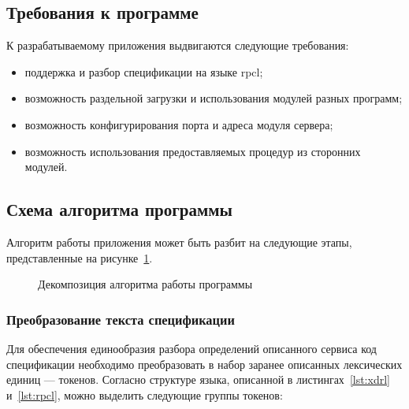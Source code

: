 
\vspace{-1\baselineskip}

\subsection{Требования к программе}

К разрабатываемому приложения выдвигаются следующие требования:
\begin{itemize}
    \item поддержка и разбор спецификации на языке rpcl;
    \item возможность раздельной загрузки и использования модулей разных
          программ;
    \item возможность конфигурирования порта и адреса модуля сервера;
    \item возможность использования предоставляемых процедур из сторонних
          модулей.
\end{itemize}

\subsection{Схема алгоритма программы}

Алгоритм работы приложения может быть разбит на следующие этапы, представленные
на рисунке~\ref{fig:main_alg}.

\begin{figure}[!h]
    \centering
    \def\svgwidth{0.18\textwidth}
    
    \caption{Декомпозиция алгоритма работы программы}
    \label{fig:main_alg}
\end{figure}

\subsubsection{Преобразование текста спецификации}

Для обеспечения единообразия разбора определений описанного сервиса код
спецификации необходимо преобразовать в набор заранее описанных лексических
единиц --- токенов. Согласно структуре языка, описанной в
листингах~\ref{lst:xdrl} и~\ref{lst:rpcl}, можно выделить следующие группы
токенов:

